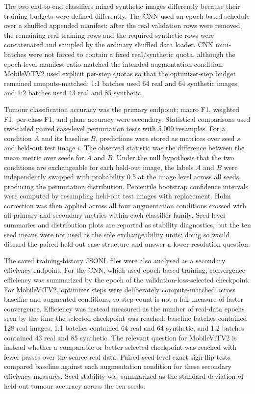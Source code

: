 \documentclass[conference,twoside]{IEEEtran}
\begin{document}
The two end-to-end classifiers mixed synthetic images differently because their training budgets were defined differently. The CNN used an epoch-based schedule over a shuffled appended manifest: after the real validation rows were removed, the remaining real training rows and the required synthetic rows were concatenated and sampled by the ordinary shuffled data loader. CNN mini-batches were not forced to contain a fixed real/synthetic quota, although the epoch-level manifest ratio matched the intended augmentation condition. MobileViTV2 used explicit per-step quotas so that the optimizer-step budget remained compute-matched: 1:1 batches used 64 real and 64 synthetic images, and 1:2 batches used 43 real and 85 synthetic.

Tumour classification accuracy was the primary endpoint; macro F1, weighted F1, per-class F1, and plane accuracy were secondary. Statistical comparisons used two-tailed paired case-level permutation tests with 5,000 resamples. For a condition $A$ and its baseline $B$, predictions were stored as matrices over seed $s$ and held-out test image $i$. The observed statistic was the difference between the mean metric over seeds for $A$ and $B$. Under the null hypothesis that the two conditions are exchangeable for each held-out image, the labels $A$ and $B$ were independently swapped with probability 0.5 at the image level across all seeds, producing the permutation distribution. Percentile bootstrap confidence intervals were computed by resampling held-out test images with replacement. Holm correction was then applied across all four augmentation conditions crossed with all primary and secondary metrics within each classifier family. Seed-level summaries and distribution plots are reported as stability diagnostics, but the ten seed means were not used as the sole exchangeability units; doing so would discard the paired held-out case structure and answer a lower-resolution question.

The saved training-history JSONL files were also analysed as a secondary efficiency endpoint. For the CNN, which used epoch-based training, convergence efficiency was summarized by the epoch of the validation-loss-selected checkpoint. For MobileViTV2, optimizer steps were deliberately compute-matched across baseline and augmented conditions, so step count is not a fair measure of faster convergence. Efficiency was instead measured as the number of real-data epochs seen by the time the selected checkpoint was reached: baseline batches contained 128 real images, 1:1 batches contained 64 real and 64 synthetic, and 1:2 batches contained 43 real and 85 synthetic. The relevant question for MobileViTV2 is instead whether a comparable or better selected checkpoint was reached with fewer passes over the scarce real data. Paired seed-level exact sign-flip tests compared baseline against each augmentation condition for these secondary efficiency measures. Seed stability was summarized as the standard deviation of held-out tumour accuracy across the ten seeds.
\end{document}
